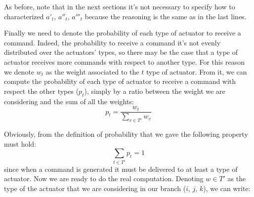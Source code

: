 \documentclass[11pt]{article}
\begin{document}
As before, note that in the next sections it's not necessary to specify how to characterized $a'_{t}$, $a''_{t}$, $a'''_{t}$ because the reasoning is the same as in the last lines.


Finally we need to denote the probability of each type of actuator to receive a command. Indeed, the probability to receive a command it's not evenly distributed over the actuators' types, so there may be the case that a type of actuator receives more commands with respect to another type.
For this reason we denote $w_t$ as the weight associated to the $t$ type of actuator.
From it, we can compute the probability of each type of actuator to receive a command with respect the other types ($p_t$), simply by a ratio between the weight we are considering and the sum of all the weights:
\begin{equation}
    p_t = \frac{w_t}{ \sum\limits_{v \in T'}{w_v} }
\end{equation}

Obviously, from the definition of probability that we gave the following property must hold:
\begin{equation}
        \sum_{t \in T'}{p_t} = 1
\end{equation}
since when a command is generated it must be delivered to at least a type of actuator.
Now we are ready to do the real computation. Denoting $w \in T'$ as the type of the actuator that we are considering in our branch ($i$, $j$, $k$), we can write:
\end{document}
